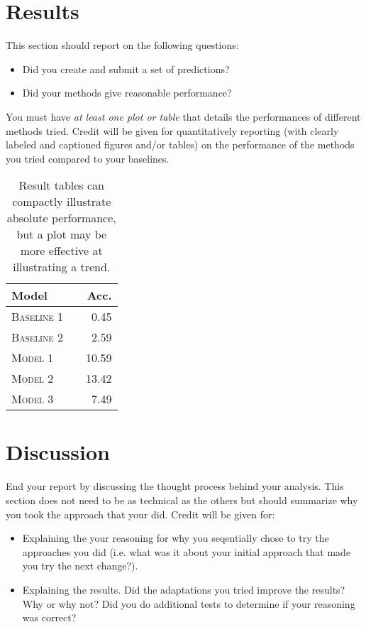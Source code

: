 \documentclass[11pt]{article}
\begin{document}
\section{Results}
This section should report on the following questions: 

\begin{itemize}
\item Did you create and submit a set of
  predictions? 
  

\item  Did your methods give reasonable performance?  
\end{itemize}

\noindent You must have \textit{at least one plot or table}
that details the performances of different methods tried. 
Credit will be given for quantitatively reporting (with clearly
labeled and captioned figures and/or tables) on the performance of the
methods you tried compared to your baselines.



\begin{table}
\centering
\begin{tabular}{llr}
 \toprule
 Model &  & Acc. \\
 \midrule
 \textsc{Baseline 1} & & 0.45\\
 \textsc{Baseline 2} & & 2.59 \\
 \textsc{Model 1} & & 10.59  \\
 \textsc{Model 2} & &13.42 \\
 \textsc{Model 3} & & 7.49\\
 \bottomrule
\end{tabular}
\caption{\label{tab:results} Result tables can compactly illustrate absolute performance, but a plot may be more effective at illustrating a trend.}
\end{table}




\section{Discussion} 


End your report by discussing the thought process behind your
analysis. This section does not need to be as technical as the others 
but should summarize why you took the approach that your did. Credit will be given for:

  \begin{itemize}
  \item Explaining the your reasoning for why you seqentially chose to
    try the approaches you did (i.e. what was it about your initial
    approach that made you try the next change?).  
  \item Explaining the results.  Did the adaptations you tried improve
    the results?  Why or why not?  Did you do additional tests to
    determine if your reasoning was correct?  
  \end{itemize}
 
\end{document}

